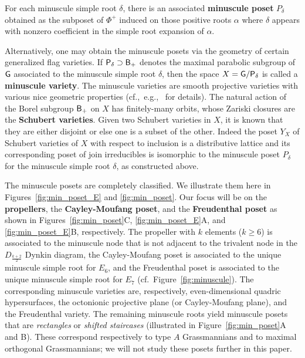 \documentclass[12pt]{amsart}
\theoremstyle{definition}
\theoremstyle{remark}
\numberwithin{equation}{section}
\begin{document}
For each minuscule simple root $\delta$, there is an associated {\bf minuscule poset} $P_\delta$ obtained as the subposet of $\Phi^+$ induced on those positive roots $\alpha$ where $\delta$ appears with nonzero coefficient in the simple root expansion of $\alpha$. 

Alternatively, one may obtain the minuscule posets via the geometry of certain generalized flag varieties. If ${\sf P}_\delta \supset {\sf B_+}$ denotes the maximal parabolic subgroup of ${\sf G}$ associated to the minuscule simple root $\delta$, then the space $X = {\sf G} / {\sf P}_\delta$ is called a {\bf minuscule variety}. The minuscule varieties are smooth projective varieties with various nice geometric properties (cf.,~e.g.,~\cite{Billey.Lakshmibai} for details). The natural action of the Borel subgroup ${\sf B}_+$ on $X$ has finitely-many orbits, whose Zariski closures are the {\bf Schubert varieties}. Given two Schubert varieties in $X$, it is known that they are either disjoint or else one is a subset of the other. Indeed the poset $Y_X$ of Schubert varieties of $X$ with respect to inclusion is a distributive lattice and its corresponding poset of join irreducibles is isomorphic to the minuscule poset $P_\delta$ for the minuscule simple root $\delta$, as constructed above.

The minuscule posets are completely classified. We illustrate them here in Figures~\ref{fig:min_poset_E} and \ref{fig:min_poset}. Our focus will be on the {\bf propellers}, the {\bf Cayley-Moufang poset}, and the {\bf Freudenthal poset} as shown in Figures~\ref{fig:min_poset}C, \ref{fig:min_poset_E}A, and \ref{fig:min_poset_E}B, respectively. The propeller with $k$ elements ($k \geq 6$) is associated to the minuscule node that is not adjacent to the trivalent node in the $D_{\frac{k+2}{2}}$ Dynkin diagram, the Cayley-Moufang poset is associated to the unique minuscule simple root for $E_6$, and the Freudenthal poset is associated to the unique minuscule simple root for $E_7$ (cf.\ Figure~\ref{fig:minuscule}). The corresponding minuscule varieties are, respectively, even-dimensional quadric hypersurfaces, the octonionic projective plane (or Cayley-Moufang plane), and the Freudenthal variety. The remaining minuscule roots yield minuscule posets that are \emph{rectangles} or \emph{shifted staircases} (illustrated in Figure~\ref{fig:min_poset}A and B). These correspond respectively to type $A$ Grassmannians and to maximal orthogonal Grassmannians; we will not study these posets further in this paper.
\end{document}
